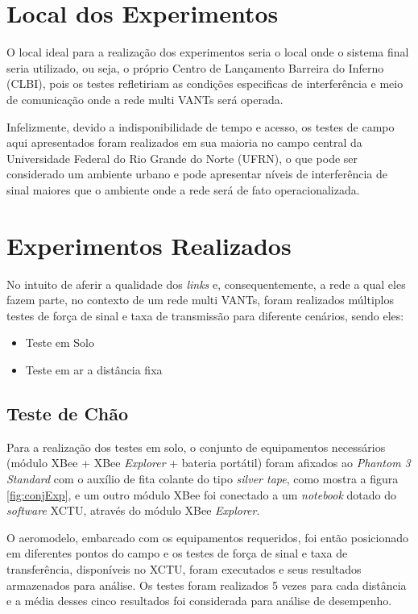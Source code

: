 \section{Local dos Experimentos}

O local ideal para a realização dos experimentos seria o local onde o sistema final seria utilizado, ou seja, o próprio Centro de Lançamento Barreira do Inferno (CLBI), pois os testes refletiriam as condições especificas de interferência e meio de comunicação onde a rede multi VANTs será operada.

Infelizmente, devido a indisponibilidade de tempo e acesso, os testes de campo aqui apresentados foram realizados em sua maioria no campo central da Universidade Federal do Rio Grande do Norte (UFRN), o que pode ser considerado um ambiente urbano e pode apresentar níveis de interferência de sinal maiores que o ambiente onde a rede será de fato operacionalizada. 

\section{Experimentos Realizados}

No intuito de aferir a qualidade dos \emph{links} e, consequentemente, a rede a qual eles fazem parte, no contexto de um rede multi VANTs, foram realizados múltiplos testes de força de sinal e taxa de transmissão para diferente cenários, sendo eles:

\begin{itemize}
\item Teste em Solo
\item Teste em ar a distância fixa
\end{itemize} 

\subsection{Teste de Chão}

Para a realização dos testes em solo, o conjunto de equipamentos necessários (módulo XBee + XBee \emph{Explorer} + bateria portátil) foram afixados ao \emph{Phantom 3 Standard} com o auxílio de fita colante do tipo \emph{silver tape}, como mostra a figura \ref{fig:conjExp}, e um outro módulo XBee foi conectado a um \emph{notebook} dotado do \emph{software} XCTU, através do módulo XBee \emph{Explorer}.

O aeromodelo, embarcado com os equipamentos requeridos, foi então posicionado em diferentes pontos do campo e os testes de força de sinal e taxa de transferência, disponíveis no XCTU, foram executados e seus resultados armazenados para análise. Os testes foram realizados 5 vezes para cada distância e a média desses cinco resultados foi considerada para análise de desempenho. 
 

